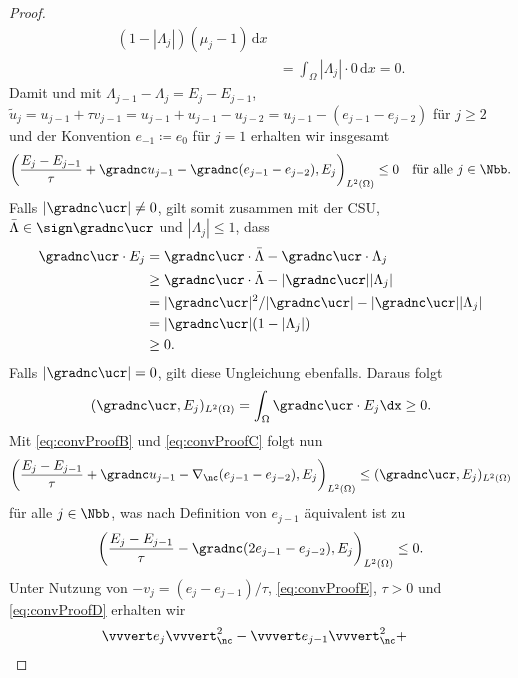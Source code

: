 \begin{proof}
\begin{align*}
    (1-|\Lambda_j|)(\mu_j-1)\,\mathrm dx \\
    &=
    \int_\Omega |\Lambda_j|\cdot
    0\,\mathrm dx =0.
  \end{align*}
  Damit und mit $\Lambda_{j-1}-\Lambda_j=E_j-E_{j-1}$, 
  $\tilde{u}_j=u_{j-1}+\tau v_{j-1}=u_{j-1}+u_{j-1}-u_{j-2}=
  u_{j-1}-(e_{j-1}-e_{j-2})$
  für $j\geq 2$ und der Konvention $e_{-1}\coloneqq e_0$ für $j=1$ erhalten wir
  insgesamt
  \begin{align}
    \label{eq:convProofB}
    \left(\frac{E_j-E_{j-1}}{\tau}+ \gradnc u_{j-1}-\gradnc
    (e_{j-1}-e_{j-2}),E_j\right)_{L^2(\Omega)}\leq 0\quad\text{für alle }
    j\in\Nbb.
  \end{align}
  Falls $|\gradnc \ucr|\neq 0$, gilt somit zusammen mit
  der CSU, $\bar\Lambda\in\sign\gradnc\ucr$ und $|\Lambda_j|\leq 1$,  dass
  \begin{align*}
    \gradnc\ucr\cdot E_j 
    &=
    \gradnc\ucr\cdot\bar\Lambda - \gradnc\ucr\cdot\Lambda_j\\
    &\geq 
    \gradnc\ucr\cdot\bar\Lambda - |\gradnc\ucr||\Lambda_j| \\
    &=
    |\gradnc\ucr|^2/|\gradnc\ucr|-|\gradnc\ucr||\Lambda_j| \\
    &= 
    |\gradnc\ucr|(1-|\Lambda_j|)\\
    &\geq
    0. 
  \end{align*}
  Falls $|\gradnc\ucr|=0$, gilt diese Ungleichung ebenfalls.
  Daraus folgt
  \begin{align}
    \label{eq:convProofC}
    (\gradnc\ucr,E_j)_{L^2(\Omega)}=\int_\Omega \gradnc\ucr\cdot E_j\dx\geq 0.
  \end{align}
  Mit \eqref{eq:convProofB} und \eqref{eq:convProofC} folgt nun
  \begin{align*}
    \left( \frac{E_j-E_{j-1}}{\tau}+ \gradnc u_{j-1}
    -\nabla_\nc(e_{j-1}-e_{j-2}),E_j\right)_{L^2(\Omega)}
    \leq
    (\gradnc\ucr,E_j)_{L^2(\Omega)}
  \end{align*}
  für alle $j\in\Nbb$, was nach Definition von $e_{j-1}$
  äquivalent ist zu
  \begin{align}
    \label{eq:convProofD}
    \left( \frac{E_j-E_{j-1}}{\tau} 
    -\gradnc(2e_{j-1}-e_{j-2}),E_j\right)_{L^2(\Omega)}\leq 0.
  \end{align}
  Unter Nutzung von $-v_j=(e_j-e_{j-1})/\tau$, \eqref{eq:convProofE}, $\tau>0$
  und \eqref{eq:convProofD} erhalten wir 
  \begin{align*}
    &\vvvert e_j \vvvert^2_\nc   -
    \vvvert e_{j-1}\vvvert_\nc^2 +

\end{align*}
\end{proof}
